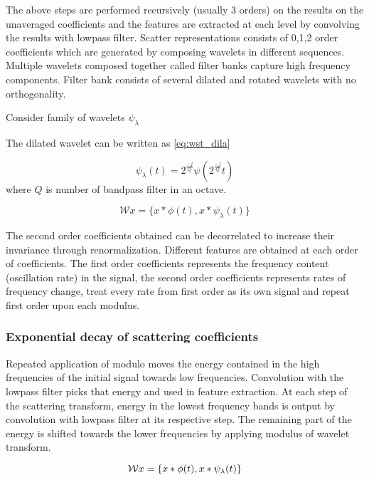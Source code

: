 The above steps are performed recursively (usually 3 orders) on the results on the unaveraged coefficients and the features are extracted at each level by convolving the results with lowpass filter. Scatter representations consists of {0,1,2} order coefficients which are generated by composing wavelets in different sequences. Multiple wavelets composed together called filter banks capture high frequency components. Filter bank consists of several dilated and rotated wavelets with no orthogonality.

Consider family of wavelets ${\psi_{\lambda}}$

The dilated wavelet can be written as \ref{eq:wst_dila}

\begin{equation} \label{eq:wst_dila}
    \psi_{\lambda}(t) = 2^{\frac{-j}{Q}}\psi(2^{\frac{-j}{Q}}t)
\end{equation}
where $Q$ is number of bandpass filter in an octave.

\begin{equation} \label{eq:wst_wt}
    \mathcal{W} x = \{x\ast \phi(t) , x\ast \psi_\lambda(t) \}
\end{equation}

The second order coefficients obtained can be decorrelated to increase their invariance through renormalization. Different features are obtained at each order of coefficients. The first order coefficients represents the frequency content (oscillation rate) in the signal, the second order coefficients represents rates of frequency change, treat every rate from first order as its own signal and repeat first order upon each modulus. 

 \subsubsection{Exponential decay of scattering coefficients}
 Repeated application of modulo moves the energy contained in the high frequencies of the initial signal towards low frequencies. Convolution with the lowpass filter picks that energy and used in  feature extraction. At each step of the scattering transform, energy in the lowest frequency bands is output by convolution with lowpass filter at its respective step. The remaining part of the energy  is shifted towards the lower frequencies by applying modulus of wavelet transform.
 
 \begin{equation} \label{eq:wst_wt}
    \mathcal{W} x = \{x\ast \phi(t) , x\ast \psi_\lambda(t) \} \\
\end{equation}

